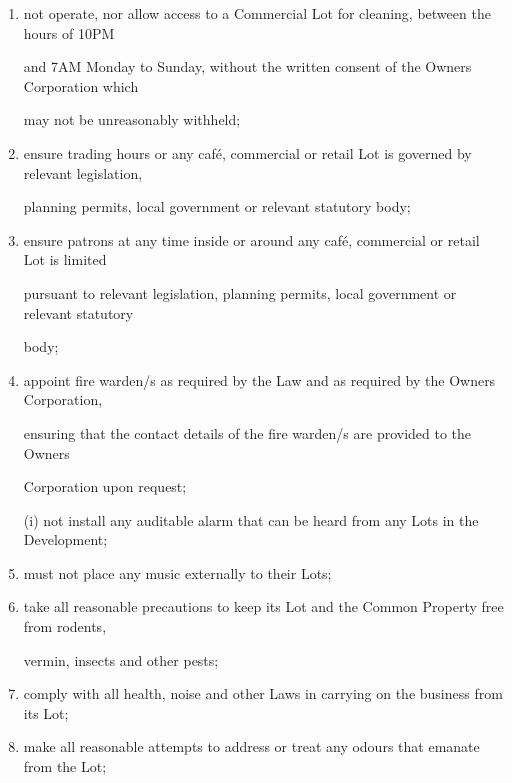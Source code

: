 \documentclass{article}
\begin{document}
\begin{enumerate}[label=\arabic*.]
\begin{enumerate}[label=\arabic{enumi}.\arabic*.]
\begin{enumerate}[label=(\arabic*)]
\begin{enumerate}[label=(\alph*)]
\item {\fontsize{9.962}{1} not operate, nor allow access to a Commercial Lot for cleaning, between the hours of 10PM }

{\fontsize{10.02}{1}and 7AM Monday to Sunday, without the written consent of the Owners Corporation which }

\newpage

{\fontsize{10.02}{1}may not be unreasonably withheld; }

\item {\fontsize{9.962}{1} ensure trading hours or any café, commercial or retail Lot is governed by relevant legislation, }

{\fontsize{10.02}{1}planning permits, local government or relevant statutory body; }

\item {\fontsize{9.962}{1} ensure patrons at any time inside or around any café, commercial or retail Lot is limited }

{\fontsize{10.02}{1}pursuant to relevant legislation, planning permits, local government or relevant statutory }

{\fontsize{10.02}{1}body; }

\item {\fontsize{9.962}{1} appoint fire warden/s as required by the Law and as required by the Owners Corporation, }

{\fontsize{10.02}{1}ensuring that the contact details of the fire warden/s are provided to the Owners }

{\fontsize{10.02}{1}Corporation upon request; }

{\fontsize{9.962}{1}(i) not install any auditable alarm that can be heard from any Lots in the Development; }

\item {\fontsize{9.962}{1} must not place any music externally to their Lots; }

\item {\fontsize{9.962}{1} take all reasonable precautions to keep its Lot and the Common Property free from rodents, }

{\fontsize{10.02}{1}vermin, insects and other pests; }

\item {\fontsize{9.962}{1} comply with all health, noise and other Laws in carrying on the business from its Lot; }

\item {\fontsize{9.962}{1} make all reasonable attempts to address or treat any odours that emanate from the Lot; }


\end{enumerate}
\end{enumerate}
\end{enumerate}
\end{enumerate}
\end{document}
